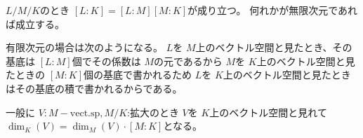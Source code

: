 \documentclass[../master_galois_theory]{subfiles}
\begin{document}
  \begin{rem}
    $L/M/K$のとき $[L:K] = [L:M][M:K]$が成り立つ。
    何れかが無限次元であれば成立する。

    有限次元の場合は次のようになる。
    $L$を $M$上のベクトル空間と見たとき、その基底は $[L:M]$個でその係数は $M$の元であるから
    $M$を $K$上のベクトル空間と見たときの $[M:K]$個の基底で書かれるため
    $L$を $K$上のベクトル空間と見たときはその基底の積で書かれるからである。

    一般に $V : M-\mathrm{vect.sp} , M/K$:拡大のとき $V$を $K$上のベクトル空間と見れて
    $\dim_K(V) = \dim_M(V) \cdot [M:K]$となる。
  \end{rem}

\clearpage
\end{document}
